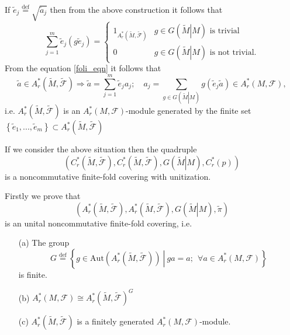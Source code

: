 \documentclass{beamer}
\theoremstyle{plain}
\newcommand{\be}{\begin{equation}}
\newcommand{\ee}{\end{equation}}
\newcommand{\Aut}{\mathrm{Aut}}
\newcommand{\sF}{\mathcal{F}}       %
\newcommand{\bydef}{\stackrel{\mathrm{def}}{=}}
\begin{document}
\begin{frame}
If $\widetilde e_j \bydef \sqrt{\widetilde a_j}$ then from the above construction it follows that
\be\label{foli_eqn}
\sum_{j = 1}^m \widetilde e_j (g \widetilde e_j)= \begin{cases}
	1_{A^*_r \left(\widetilde M, \widetilde{\sF}\right)} &  g\in G\left(\left.\widetilde M\right| M\right)\text{ is trivial}\\
		0 &  g\in G\left(\left.\widetilde M\right| M\right)\text{ is not  trivial}.
\end{cases}
\ee
From the equation \eqref{foli_eqn} it follows that
$$
\widetilde a \in A^*_r \left(\widetilde M, \widetilde{\sF}\right)\Rightarrow \widetilde a = \sum_{j=1}^m \widetilde e_j a_j; \quad a_j= \sum_{g \in G\left(\left.\widetilde M\right| M\right)} g\left(  \widetilde e_j  \widetilde a\right)\in A^*_r \left( M, {\sF}\right), 
$$
i.e. $A^*_r \left(\widetilde M, \widetilde{\sF}\right)$ is an $A^*_r \left( M, {\sF}\right)$-module generated by the finite set $\left\{\widetilde e_1, ..., \widetilde e_m\right\}\subset A^*_r \left(\widetilde M, \widetilde{\sF}\right)$
\end{frame}
\begin{frame}
\begin{theorem}
If we consider the above situation then the quadruple
$$
\left(C^*_r \left(\widetilde M, \widetilde{\sF}\right), C^*_r \left(\widetilde M, \widetilde{\sF}\right), G\left(\left.\widetilde M\right| M\right), C^*_r\left(p \right) \right)
$$
is a noncommutative finite-fold covering with unitization.
\end{theorem}
Firstly we prove that
	$$
	\left(A^*_r \left(\widetilde M, \widetilde{\sF}\right), A^*_r \left(\widetilde M, \widetilde{\sF}\right), G\left(\left.\widetilde M\right| M\right), \widetilde\pi \right)
	$$
is an unital noncommutative finite-fold covering, i.e.
			\begin{enumerate}
		\item[(a)] The group  
		$$
		G \bydef \left\{ \left.g \in \Aut\left(A^*_r \left(\widetilde M, \widetilde{\sF}\right) \right)~\right|~ ga = a;~~\forall a \in A^*_r \left( M, {\sF}\right)\right\}
		$$
		is finite.
		\item[(b)] 	$
		A^*_r\left( M, {\sF}\right) \cong A^*_r \left(\widetilde M, \widetilde{\sF}\right)^G$
			\item[(c)] $A^*_r \left(\widetilde M, \widetilde{\sF}\right)$ is a finitely generated $A^*_r \left( M, {\sF}\right)$-module.
	\end{enumerate}
\end{frame}
\end{document}
